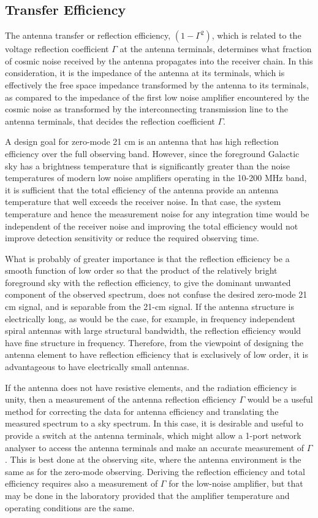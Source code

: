\subsection{Transfer Efficiency}
   
   The antenna transfer or reflection efficiency, $(1-\Gamma^2)$, which is related to the voltage reflection coefficient $\Gamma$ at the antenna terminals, determines what fraction of cosmic noise received by the antenna propagates into the receiver chain.  In this consideration, it is the impedance of the antenna at its terminals, which is effectively the free space impedance transformed by the antenna to its terminals, as compared to the impedance of the first low noise amplifier encountered by the cosmic noise as transformed by the interconnecting transmission line to the antenna terminals, that decides the reflection coefficient $\Gamma$.  
   
   A design goal for zero-mode 21 cm is an antenna that has high reflection efficiency over the full observing band.  However, since the foreground Galactic sky has a brightness temperature that is significantly greater than the noise temperatures of modern low noise amplifiers operating in the 10-200 MHz band, it is sufficient that the total efficiency of the antenna provide an antenna temperature that well exceeds the receiver noise.  In that case, the system temperature and hence the measurement noise for any integration time would be independent of the receiver noise and improving the total efficiency would not improve detection sensitivity or reduce the required observing time.
   
   What is probably of greater importance is that the reflection efficiency be a smooth function of low order so that the product of the relatively bright foreground sky with the reflection efficiency, to give the dominant unwanted component of the observed spectrum, does not confuse the desired zero-mode 21 cm signal, and is separable from the 21-cm signal.  If the antenna structure is electrically long, as would be the case, for example, in frequency independent spiral antennas with large structural bandwidth, the reflection efficiency would have fine structure in frequency.  Therefore, from the viewpoint of designing the antenna element to have reflection efficiency that is exclusively of low order, it is advantageous to have electrically small antennas.
   
   If the antenna does not have resistive elements, and the radiation efficiency is unity, then a measurement of the antenna reflection efficiency $\Gamma$ would be a useful method for correcting the data for antenna efficiency and translating the measured spectrum to a sky spectrum. In this case, it is desirable and useful to provide a switch at the antenna terminals, which might allow a 1-port network analyser to access the antenna terminals and make an accurate measurement of $\Gamma$.  This is best done at the observing site, where the antenna environment is the same as for the zero-mode observing.  Deriving the reflection efficiency and total efficiency requires also a measurement of $\Gamma$ for the low-noise amplifier, but that may be done in the laboratory provided that the amplifier temperature and operating conditions are the same.
   
